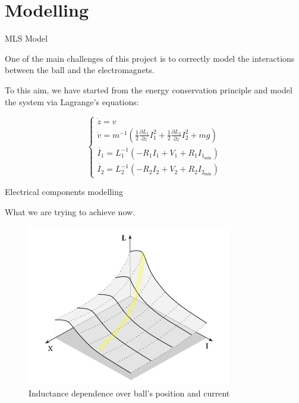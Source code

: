 \section{Modelling}

\begin{frame}{MLS Model}

    One of the main challenges of this project is to correctly model the interactions between the ball and the electromagnets.

    To this aim, we have started from the energy conservation principle and model the system via Lagrange's equations:

    \begin{equation}
    \begin{cases}
        \dot{z} = v \\
        \dot{v} = m^{-1} \left( \frac{1}{2} \frac{\partial L_1}{\partial z} I_1^2 + \frac{1}{2} \frac{\partial L_2}{\partial z} I_2^2 + m g \right) \\
        \dot{I_1} = L_1^{-1} \left( -R_1 I_1 + V_1 + R_1 I_{1_{\text{min}}} \right) \\
        \dot{I_2} = L_2^{-1} \left( -R_2 I_2 + V_2 + R_2 I_{2_{\text{min}}} \right)
    \end{cases}
    \label{eq:reduced_equations_of_motion_final}
\end{equation}

\end{frame}


\begin{frame}{Electrical components modelling}

    What we are trying to achieve now.

    \begin{figure}
        \centering
        \includegraphics[width=0.8\textwidth]{img/inductance_curve.jpg}
        \caption{Inductance dependence over ball's position and current}
    \end{figure}

\end{frame}